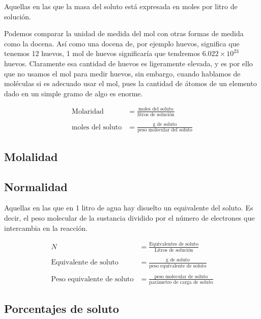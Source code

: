 Aquellas en las que la masa del soluto está expresada en moles por litro de solución.

Podemos comparar la unidad de medida del mol con otras formas de medida como la docena. Así como una docena de, por ejemplo huevos, significa que tenemos 12 huevos, 1 mol de huevos significaría que tendremos $6.022 \times 10^{23}$ huevos. Claramente esa cantidad de huevos es ligeramente elevada, y es por ello que no usamos el mol para medir huevos, sin embargo, cuando hablamos de moléculas si es adecuado usar el mol, pues la cantidad de átomos de un elemento dado en un simple gramo de algo es enorme.

\begin{align*}
\text{Molaridad} &= \frac{\text{moles del soluto}}{\text{litros de solución}}
\\
\\
\text{moles del soluto} &= \frac{\text{g de soluto}}{\text{peso molecular del soluto}}
\end{align*}

\subsection{Molalidad}

\subsection{Normalidad}

Aquellas en las que en 1 litro de agua hay disuelto un equivalente del soluto. Es decir, el peso molecular de la sustancia dividido por el número de electrones que intercambia en la reacción.

\begin{align*}
    N &= \frac{\text{Equivalentes de soluto}}{\text{Litros de solución}}
    \\
    \\
    \text{Equivalente de soluto} &= \frac{\text{g de soluto}}{\text{peso equivalente de soluto}}
    \\
    \\
    \text{Peso equivalente de soluto} &= \frac{\text{peso molecular de soluto}}{\text{parámetro de carga de soluto}}
\end{align*}

\subsection{Porcentajes de soluto}

